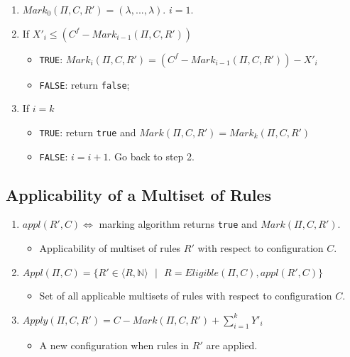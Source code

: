 \documentclass{article}
\newcommand{\s}{\text{ }}
\begin{document}
\begin{appendices}
\begin{enumerate}
   \item $Mark_0(\Pi, C, R') = (\lambda,...,\lambda)$. $i = 1$.
   \item If $X'_i \leq (C^f - Mark_{i-1}(\Pi, C, R'))$
         \begin{itemize}
         \item \texttt{TRUE}: $Mark_i(\Pi, C, R') = (C^f - Mark_{i-1}(\Pi, C, R')) - X'_i$
         \item \texttt{FALSE}: return \texttt{false};
         \end{itemize}
   \item If $i=k$
         \begin{itemize}
         \item \texttt{TRUE}: return \texttt{true} and $Mark(\Pi, C, R') = Mark_k(\Pi, C, R')$
         \item \texttt{FALSE}: $i = i + 1$. Go back to step 2.
         \end{itemize}
\end{enumerate}


\subsection{Applicability of a Multiset of Rules} \label{a-ff1-applicable}

\begin{enumerate}
   \item $appl(R',C) \Leftrightarrow $ marking algorithm returns \texttt{true} and $Mark(\Pi, C, R')$.
         \begin{itemize}
         \item Applicability of multiset of rules $R'$ with respect to configuration $C$.
         \end{itemize}
   \item $Appl(\Pi, C) = \{R' \in \langle R, \mathbb{N} \rangle \s | \s R = Eligible(\Pi,C), appl(R',C) \}$
         \begin{itemize}
         \item Set of all applicable multisets of rules  with respect to configuration $C$.
         \end{itemize}
   \item $Apply(\Pi, C,R') = C - Mark(\Pi, C, R') + \sum_{i=1}^{k} Y'_i $
         \begin{itemize}
         \item A new configuration when rules in $R'$ are applied.
         \end{itemize}
\end{enumerate}


\end{appendices}
\end{document}
